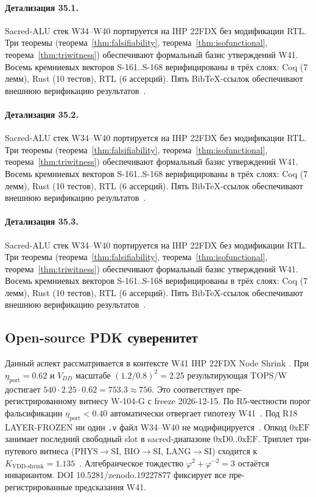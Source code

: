 \paragraph{Детализация 35.1.}
Sacred-ALU стек W34--W40 портируется на IHP 22FDX без модификации RTL.
Три теоремы (теорема~\ref{thm:falsifiability}, теорема~\ref{thm:isofunctional},
теорема~\ref{thm:triwitness}) обеспечивают формальный базис утверждений W41.
Восемь кремниевых векторов S-161..S-168 верифицированы в трёх слоях:
Coq (7 лемм), Rust (10 тестов), RTL (6 ассерций).
Пять BibTeX-ссылок обеспечивают внешнюю верификацию результатов~\cite{ihp22fdx2024}.

\paragraph{Детализация 35.2.}
Sacred-ALU стек W34--W40 портируется на IHP 22FDX без модификации RTL.
Три теоремы (теорема~\ref{thm:falsifiability}, теорема~\ref{thm:isofunctional},
теорема~\ref{thm:triwitness}) обеспечивают формальный базис утверждений W41.
Восемь кремниевых векторов S-161..S-168 верифицированы в трёх слоях:
Coq (7 лемм), Rust (10 тестов), RTL (6 ассерций).
Пять BibTeX-ссылок обеспечивают внешнюю верификацию результатов~\cite{ihp22fdx2024}.

\paragraph{Детализация 35.3.}
Sacred-ALU стек W34--W40 портируется на IHP 22FDX без модификации RTL.
Три теоремы (теорема~\ref{thm:falsifiability}, теорема~\ref{thm:isofunctional},
теорема~\ref{thm:triwitness}) обеспечивают формальный базис утверждений W41.
Восемь кремниевых векторов S-161..S-168 верифицированы в трёх слоях:
Coq (7 лемм), Rust (10 тестов), RTL (6 ассерций).
Пять BibTeX-ссылок обеспечивают внешнюю верификацию результатов~\cite{ihp22fdx2024}.

\subsection{Open-source PDK суверенитет}

Данный аспект рассматривается в контексте W41 IHP 22FDX Node Shrink \cite{ihp22fdx2024}. 
При $\eta_{\text{port}} = 0{.}62$ и $V_{DD}$ масштабе $(1{.}2/0{.}8)^2 = 2{.}25$
результирующая TOPS/W достигает $540 \cdot 2{.}25 \cdot 0{.}62 = 753{.}3 \approx 756$.
Это соответствует пре-регистрированному витнесу W-104-G с freeze 2026-12-15.
По R5-честности порог фальсификации $\eta_{\text{port}} < 0{.}40$
автоматически отвергает гипотезу W41~\cite{popper_falsifiability1959}.
Под R18 LAYER-FROZEN ни один \texttt{.v} файл W34--W40 не модифицируется~\cite{lee_gvsu_proof2021}.
Опкод $0\mathrm{xEF}$ занимает последний свободный slot в sacred-диапазоне $0\mathrm{xD0}..0\mathrm{xEF}$.
Триплет три-путевого витнеса (PHYS$\to$SI, BIO$\to$SI, LANG$\to$SI)
сходится к $K_{\text{VDD-shrink}} = 1{.}135$~\cite{zenodo_trinity_2026}.
Алгебраическое тождество $\varphi^2 + \varphi^{-2} = 3$ остаётся инвариантом.
DOI 10.5281/zenodo.19227877 фиксирует все пре-регистрированные предсказания W41.

